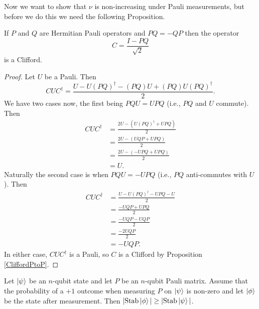 \documentclass[12pt]{dalthesis}
\begin{document}
Now we want to show that $\nu$ is non-increasing under Pauli measurements, but before we do this we need the following Proposition.

\begin{proposition}
\label{ClifUnitary}
If $P$ and $Q$ are Hermitian Pauli operators and $PQ = - QP$ then the operator
\begin{equation*}
C = \frac{I -PQ}{\sqrt{2}}
\end{equation*}
is a Clifford.
\end{proposition}
\begin{proof}
Let $U$ be a Pauli. Then 
\begin{equation*}
CUC^\dag = \frac{U-U(PQ)^\dag - (PQ)U + (PQ)U(PQ)^\dag}{2}.
\end{equation*}
We have two cases now, the first being $PQU = UPQ$ (i.e., $PQ$ and $U$ commute). Then 
\begin{equation*}
\begin{split}
CUC^\dag & = \frac{2U - (U(PQ)^\dag + UPQ)}{2} \\
& = \frac{2U - (UQP + UPQ)}{2} \\
& = \frac{2U - (-UPQ + UPQ)}{2} \\
& = U.
\end{split}
\end{equation*}
Naturally the second case is when $PQU = -UPQ$ (i.e., $PQ$ anti-commutes with $U$). Then
\begin{equation*}
\begin{split}
CUC^\dag & = \frac{U - U(PQ)^\dag - UPQ - U}{2} \\
& = \frac{-UQP + UPQ}{2} \\
& = \frac{-UQP - UQP}{2} \\
& = \frac{-2UQP}{2} \\
& = -UQP.
\end{split}
\end{equation*}
In either case, $CUC^\dag$ is a Pauli, so $C$ is a Clifford by Proposition \ref{CliffordPtoP}.
\end{proof}

\begin{lemma}
\label{nullity outcome}
Let $\ket{\psi}$ be an $n$-qubit state and let $P$ be an $n$-qubit Pauli matrix. Assume that the probability of a $+1$ outcome when measuring $P$ on $\ket{\psi}$ is non-zero and let $\ket{\phi}$ be the state after measurement. Then $|\text{Stab}\ket{\phi}| \geq |\text{Stab}\ket{\psi}|$.
\end{lemma}
\end{document}
